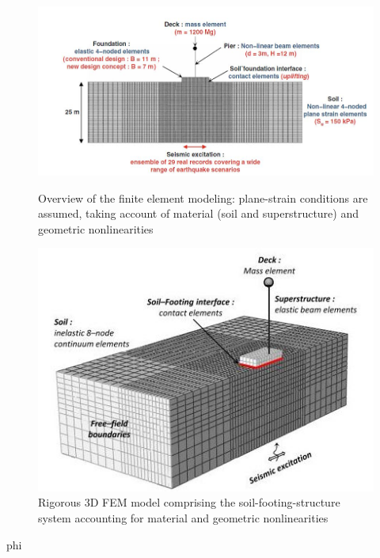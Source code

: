 \documentclass[11pt,a4paper]{report}
\begin{document}
\begin{figure}[!h]
	\centering
	\begin{minipage}[b]{0.45\textwidth}
		\includegraphics[width=\textwidth]{scheme2D}
		\caption{Overview of the finite element modeling: plane-strain conditions are assumed, taking account of material (soil and superstructure) and geometric nonlinearities}
		\label{2d}
	\end{minipage}
	\hfill
	\begin{minipage}[b]{0.45\textwidth}
		\includegraphics[width=\textwidth]{3d_model}
		\caption{Rigorous 3D FEM model comprising the soil-footing-structure system accounting for material and geometric nonlinearities}
		\label{3d}
	\end{minipage}
\end{figure} 
\gls{phi}
\newpage
\end{document}
